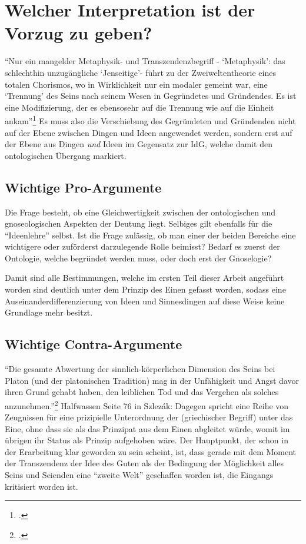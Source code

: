 \section{Welcher Interpretation ist der Vorzug zu geben?}
\enquote{Nur ein mangelder Metaphysik- und Transzendenzbegriff - \enquote{Metaphysik}: das schlechthin unzugängliche \enquote{Jenseitige}- führt zu der Zweiweltentheorie eines totalen Chorismos, wo in Wirklichkeit nur ein modaler gemeint war, eine \enquote{Trennung} des Seins nach seinem Wesen in Gegründetes und Gründendes. Es ist eine Modifizierung, der es ebensosehr auf die Trennung wie auf die Einheit ankam}\footcite[][S. 96]{Hirschberger}
Es muss also die Verschiebung des Gegründeten und Gründenden nicht auf der Ebene zwischen Dingen und Ideen angewendet werden, sondern erst auf der Ebene aus Dingen \emph{und} Ideen im Gegensatz zur IdG, welche damit den ontologischen Übergang markiert.
\subsection{Wichtige Pro-Argumente}
Die Frage besteht, ob eine Gleichwertigkeit zwischen der ontologischen und gnoseologischen Aspekten der Deutung liegt. Selbiges gilt ebenfalls für die \enquote{Ideenlehre} selbst. Ist die Frage zulässig, ob man einer der beiden Bereiche eine wichtigere oder zuförderst darzulegende Rolle beimisst? Bedarf es zuerst der Ontologie, welche begründet werden muss, oder doch erst der Gnoselogie?

Damit sind alle Bestimmungen, welche im ersten Teil dieser Arbeit angeführt worden sind deutlich unter dem Prinzip des Einen gefasst worden, sodass eine Auseinanderdifferenzierung von Ideen und Sinnesdingen auf diese Weise keine Grundlage mehr besitzt. 
\subsection{Wichtige Contra-Argumente}
\enquote{Die gesamte Abwertung der sinnlich-körperlichen Dimension des Seins bei Platon (und der platonischen Tradition) mag in der Unfähigkeit und Angst davor ihren Grund gehabt haben, den leiblichen Tod und das Vergehen als solches anzunehmen.}\footcite[][S. 99f.]{ThurnerDualismus}
Halfwassen Seite 76 in Szlezák: Dagegen spricht eine Reihe von Zeugnissen für eine prizipielle Unterordnung der (griechischer Begriff) unter das Eine, ohne dass sie als das Prinzipat aus dem Einen abgleitet würde, womit im übrigen ihr Status als Prinzip aufgehoben wäre.
Der Hauptpunkt, der schon in der Erarbeitung klar geworden zu sein scheint, ist, dass gerade mit dem Moment der Transzendenz der Idee des Guten als der Bedingung der Möglichkeit alles Seins und Seienden eine \enquote{zweite Welt} geschaffen worden ist, die Eingangs kritisiert worden ist.


